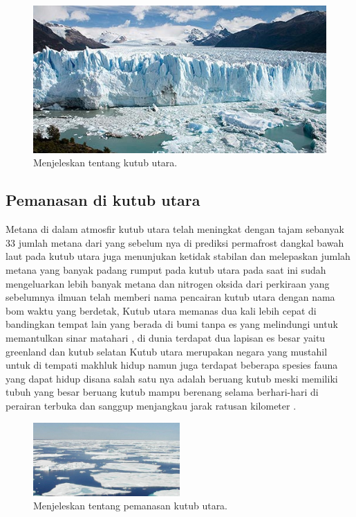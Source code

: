 \begin{figure}[ht]
\centerline{\includegraphics[width=.5\textwidth]{figures/arctic.jpg}}
\caption{Menjeleskan tentang kutub utara.}	
\label{Kutub_Utara}
\end{figure}
	
\subsection{Pemanasan di kutub utara}
		Metana di dalam atmosfir kutub utara telah meningkat dengan tajam sebanyak 33%
	jumlah metana dari yang sebelum nya di prediksi permafrost dangkal bawah laut pada kutub utara juga menunjukan ketidak stabilan dan melepaskan jumlah metana
	yang banyak padang rumput pada kutub utara pada saat ini sudah mengeluarkan lebih banyak metana dan nitrogen oksida dari perkiraan yang sebelumnya ilmuan 
	telah memberi nama pencairan kutub utara dengan nama bom waktu yang berdetak, Kutub utara memanas dua kali lebih cepat di bandingkan tempat lain yang berada
	di bumi tanpa es yang melindungi untuk memantulkan sinar matahari , di dunia terdapat dua lapisan es besar yaitu greenland dan kutub selatan Kutub utara merupakan
	negara yang mustahil untuk di tempati makhluk hidup namun juga terdapat beberapa spesies fauna yang dapat hidup disana salah satu nya adalah beruang kutub
	meski memiliki tubuh yang besar beruang kutub mampu berenang selama berhari-hari di perairan terbuka dan sanggup menjangkau jarak ratusan kilometer .

\begin{figure}[ht]
\centerline{\includegraphics[width=0.5\textwidth]{figures/arctic1.pdf}}
\caption{Menjeleskan tentang pemanasan kutub utara.}	
\label{Pemanasan_Kutub_Utara}
\end{figure}

